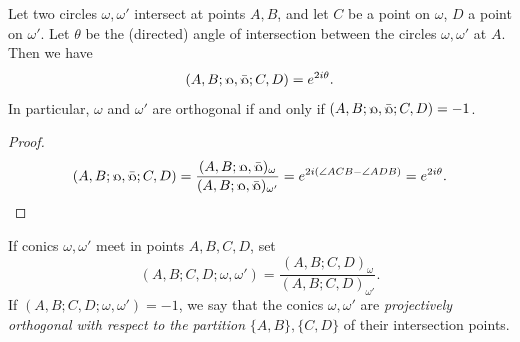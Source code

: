 \begin{prop} Let two circles $\omega, \omega'$ intersect at points $A,B$, and let $C$ be a point on $\omega$, $D$ a point on $\omega'$. Let $\theta$ be the (directed) angle of intersection between the circles $\omega, \omega'$ at $A$. Then we have
\[
(A,B;\fish,\bar\fish;C,D) = e^{2i\theta}.
\]
In particular, $\omega$ and $\omega'$ are orthogonal if and only if $(A,B;\fish,\bar\fish;C,D) = -1$.
\end{prop}
\begin{proof}
\[
(A,B;\fish,\bar\fish;C,D) = \frac{(A,B;\fish,\bar\fish)_\omega}{(A,B;\fish,\bar\fish)_{\omega'}} = e^{2i(\angle ACB - \angle ADB)} = e^{2i\theta}.\qedhere
\]
\end{proof}

\begin{defn} If conics $\omega,\omega'$ meet in points $A,B,C,D$, set
\[
(A,B;C,D;\omega,\omega') = \frac{(A,B;C,D)_\omega}{(A,B;C,D)_{\omega'}}.
\]
If $(A,B;C,D;\omega,\omega') = -1$, we say that the conics $\omega, \omega'$ are \emph{projectively orthogonal with respect to the partition} $\{A,B\},\{C,D\}$ of their intersection points.
\end{defn}

